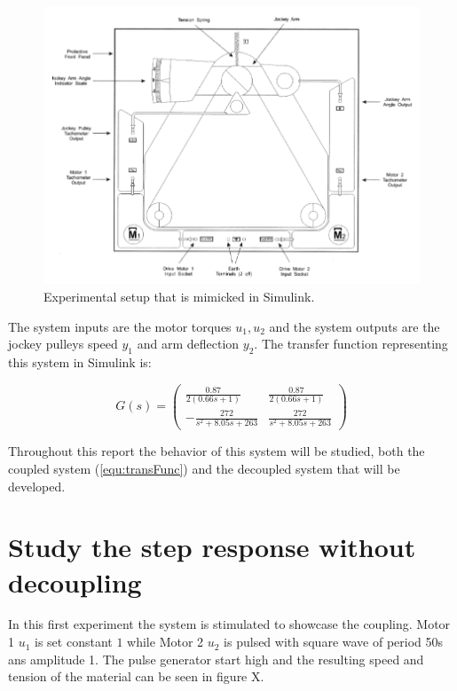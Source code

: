\documentclass[a4paper, titlepage]{article}
\begin{document}
\begin{figure}[h!]
\center
\includegraphics[scale=0.65]{../figures/experimentSystem.png}
\caption{Experimental setup that is mimicked in Simulink.}
\label{fig:expSys}
\end{figure}

The system inputs are the motor torques $u_1, u_2$ and the system outputs are the jockey pulleys speed $y_1$ and arm deflection $y_2$.
The transfer function representing this system in Simulink is:

\begin{equation}
G(s) = 
\begin{pmatrix}
\frac{0.87}{2(0.66s + 1)} & \frac{0.87}{2(0.66s + 1)} \\[6pt]
-\frac{272}{s^2 + 8.05s + 263} & \frac{272}{s^2 + 8.05s + 263}
\end{pmatrix}
\label{equ:transFunc}
\end{equation}

Throughout this report the behavior of this system will be studied, both the coupled system (\ref{equ:transFunc}) and the decoupled system that will be developed.

\section{Study the step response without decoupling}
In this first experiment the system is stimulated to showcase the coupling.
Motor 1 $u_1$ is set constant $1$ while Motor 2 $u_2$ is pulsed with square wave of period 50s ans amplitude 1.
The pulse generator start high and the resulting speed and tension of the material can be seen in figure X.
\end{document}
